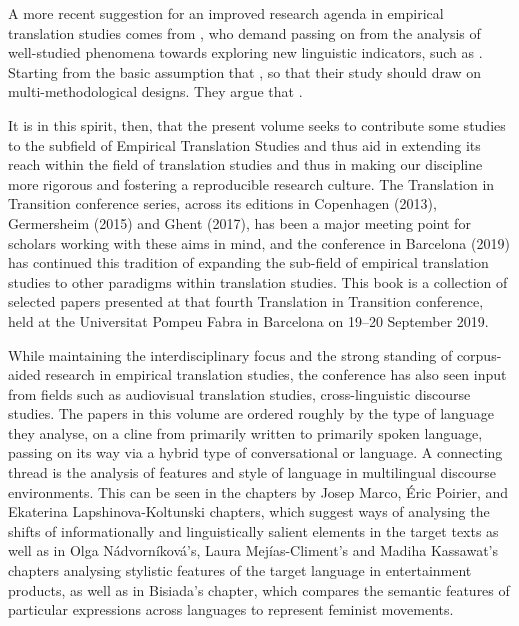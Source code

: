 \begin{refsection}
A more recent suggestion for an improved research agenda in empirical translation studies comes from \textcite{sutetal19}, who demand passing on from the analysis of well-studied phenomena towards exploring new linguistic indicators, such as . Starting from the basic assumption that , so that their study should draw on multi-methodological designs. They argue that .

It is in this spirit, then, that the present volume seeks to contribute some studies to the subfield of Empirical Translation Studies and thus aid in extending its reach within the field of translation studies and thus in making our discipline more rigorous and fostering a reproducible research culture. The Translation in Transition conference series, across its editions in Copenhagen (2013), Germersheim (2015) and Ghent (2017), has been a major meeting point for scholars working with these aims in mind, and the conference in Barcelona (2019) has continued this tradition of expanding the sub-field of empirical translation studies to other paradigms within translation studies. This book is a collection of selected papers presented at that fourth Translation in Transition conference, held at the Universitat Pompeu Fabra in Barcelona on 19--20 September 2019.

\hspace*{-1mm}While maintaining the interdisciplinary focus and the strong standing of cor\-pus-aided research in empirical translation studies, the conference has also seen input from fields such as audiovisual translation studies, cross-linguistic discourse studies. The papers in this volume are ordered roughly by the type of language they analyse, on a cline from primarily written to primarily spoken language, passing on its way via a hybrid type of conversational or  language. A connecting thread is the analysis of features and style of language in multilingual discourse environments. This can be seen in the chapters by Josep Marco, Éric Poirier, and Ekaterina Lapshinova-Koltunski chapters, which suggest ways of analysing the shifts of informationally and linguistically salient elements in the target texts as well as in Olga Nádvorníková's, Laura Mejías-Climent's and Madiha Kassawat's chapters analysing stylistic features of the target language in entertainment products, as well as in Bisiada's chapter, which compares the semantic features of particular expressions across languages to represent feminist movements.


\end{refsection}
